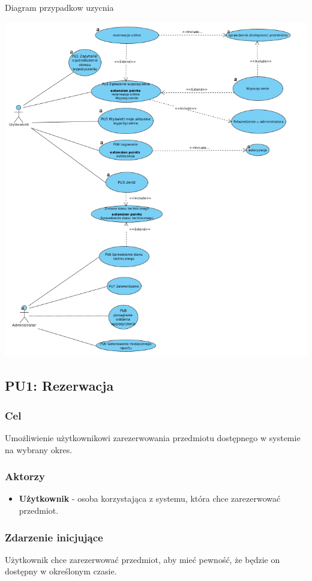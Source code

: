 \documentclass{article}
\begin{document}
Diagram przypadkow uzycnia

\includegraphics[width=\textwidth]{media/use_case.png}
\subsection{PU1: Rezerwacja}

\subsubsection{Cel}
Umożliwienie użytkownikowi zarezerwowania przedmiotu dostępnego w systemie na wybrany okres.

\subsubsection{Aktorzy}
\begin{itemize}
    \item \textbf{Użytkownik} - osoba korzystająca z systemu, która chce zarezerwować przedmiot.
\end{itemize}

\subsubsection{Zdarzenie inicjujące}
Użytkownik chce zarezerwować przedmiot, aby mieć pewność, że będzie on dostępny w określonym czasie.
\end{document}
